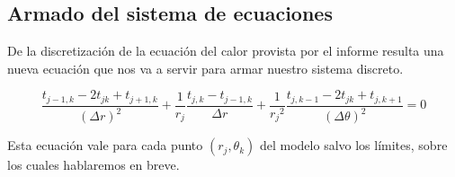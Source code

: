 

\subsection{Armado del sistema de ecuaciones}
De la discretización de la ecuación del calor provista por el informe resulta una nueva ecuación que nos va a servir para armar nuestro sistema discreto.

\begin{equation}\label{calor}
\frac{t_{j-1,k}-2t_{jk}+t_{j+1,k}}{(\Delta r)^2}+\frac{1}{r_j}\frac{t_{j,k}-t_{j-1,k}}{\Delta r}+\frac{1}{{r_j}^2}\frac{t_{j,k-1}-2t_{jk}+t_{j,k+1}}{(\Delta \theta)^2} = 0 
\end{equation}

Esta ecuación vale para cada punto $(r_j, \theta_k)$ del modelo salvo los límites, sobre los cuales hablaremos en breve.

